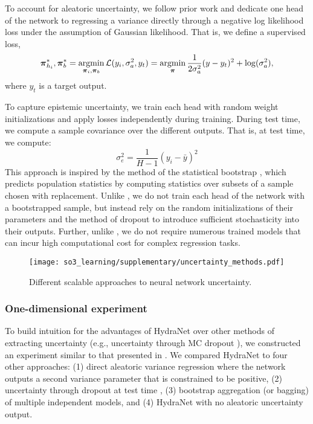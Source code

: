 To account for aleatoric uncertainty, we follow prior work \citep{Haarnoja2016-ph,Lakshminarayanan2017} and dedicate one head of the network to regressing a variance directly through a negative log likelihood loss under the assumption of Gaussian likelihood. That is, we define a supervised loss,
\begin{equation}
\boldsymbol{\mathbf{\pi}}_{h_i}^*, \boldsymbol{\mathbf{\pi}}_b^* = \operatorname*{argmin}_{\boldsymbol{\mathbf{\pi}}_i, \boldsymbol{\mathbf{\pi}}_b} \mathcal{L}(y_i, \sigma_a^2, y_t) = \operatorname*{argmin}_{\boldsymbol{\mathbf{\pi}}} \frac{1}{2\sigma_a^2}(y-y_t)^2 	+ \log(\sigma_a^2),
\end{equation}
where $y_t$ is a target output.


To capture epistemic uncertainty, we train each head with random weight initializations and apply losses independently during training. During test time, we compute a sample covariance over the different outputs. That is, at test time, we compute:
\begin{equation}
\sigma_e^2 = \frac{1}{H-1} (y_i - \bar{y})^2	
\end{equation}
 This approach is inspired by the method of the statistical bootstrap \citep{Osband2016}, which predicts population statistics by computing statistics over subsets of a sample chosen with replacement. Unlike \cite{Osband2016}, we do not train each head of the network with a bootstrapped sample, but instead rely on the random initializations of their parameters and the method of dropout to introduce sufficient stochasticity into their outputs. Further, unlike \cite{Lakshminarayanan2017}, we do not require numerous trained models that can incur high computational cost for complex regression tasks.


\begin{figure*}
	\centering
	\texttt{[image: so3\_learning/supplementary/uncertainty\_methods.pdf]}
	\caption{Different scalable approaches to neural network uncertainty. }
	\label{fig:nn-uncertainty}
\end{figure*}

\subsubsection{One-dimensional experiment}

To build intuition for the advantages of HydraNet over other methods of extracting uncertainty (e.g., uncertainty through MC dropout \citep{Gal2016-ny}), we constructed an experiment similar to that presented in \citep{Osband2016}. We compared HydraNet to four other approaches: (1) direct aleatoric variance regression where the network outputs a second variance parameter that is constrained to be positive, (2) uncertainty through dropout at test time \citep{Gal2016-ny}, (3) bootstrap aggregation (or bagging) of multiple independent models, and (4) HydraNet with no aleatoric uncertainty output.  

